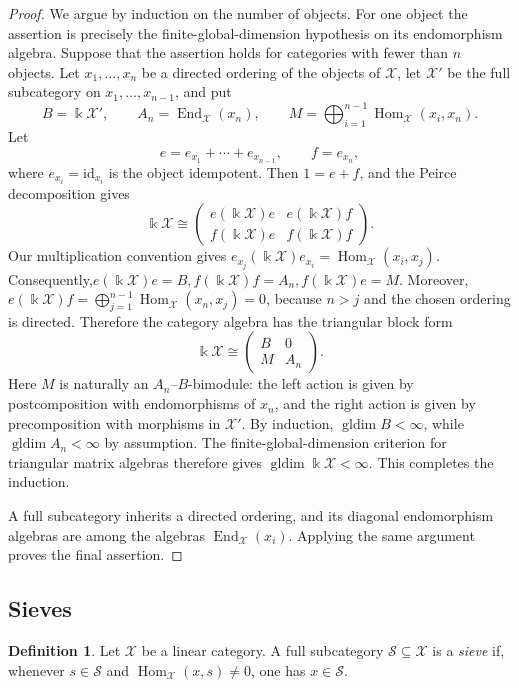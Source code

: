 \documentclass[12pt,a4paper,english,reqno]{amsart}
\theoremstyle{plain}
\theoremstyle{definition}
\newtheorem{definition}[theorem]{Definition}
\newcommand{\kk}{\Bbbk}
\newcommand{\Hom}{\operatorname{Hom}}
\newcommand{\End}{\operatorname{End}}
\newcommand{\gldim}{\operatorname{gldim}}
\newcommand{\id}{\mathrm{id}}
\newcommand{\X}{\mathcal X}
\begin{document}
\begin{proof}
We argue by induction on the number of objects.  For one object the assertion
is precisely the finite-global-dimension hypothesis on its endomorphism
algebra.  Suppose that the assertion holds for categories with fewer than
$n$ objects.  Let $x_1,\ldots,x_n$ be a directed ordering of the objects
of $\X$, let $\X'$ be the full subcategory on
$x_1,\ldots,x_{n-1}$, and put
\[
 B=\kk\X',\qquad A_n=\End_{\X}(x_n),\qquad
 M=\bigoplus_{i=1}^{n-1}\Hom_{\X}(x_i,x_n).
\]
Let
\[
e=e_{x_1}+\cdots+e_{x_{n-1}},
\qquad
f=e_{x_n},
\]
where $e_{x_i}=\id_{x_i}$ is the object idempotent. Then
$1=e+f$, and the Peirce decomposition gives
\[
\kk\X
\cong
\begin{pmatrix}
e(\kk\X)e & e(\kk\X)f\\
f(\kk\X)e & f(\kk\X)f
\end{pmatrix}.
\]
Our multiplication convention gives $e_{x_j}(\kk\X)e_{x_i}=\Hom_{\X}(x_i,x_j).
$
Consequently,$e(\kk\X)e=B, f(\kk\X)f=A_n, f(\kk\X)e=M$.
Moreover, $e(\kk\X)f=\bigoplus_{j=1}^{n-1}\Hom_{\X}(x_n,x_j)=0$,
because $n>j$ and the chosen ordering is directed. Therefore the
category algebra has the triangular block form
\[
\kk\X\cong
\begin{pmatrix}
B&0\\
M&A_n
\end{pmatrix}.
\]
Here $M$ is naturally an $A_n$--$B$-bimodule: the left action is
given by postcomposition with endomorphisms of $x_n$, and the right
action is given by precomposition with morphisms in $\X'$.
By induction,
$\gldim B<\infty$, while $\gldim A_n<\infty$ by assumption.  The
finite-global-dimension criterion for triangular matrix algebras
\cite[Corollary~6.3]{MinamotoYamaura} therefore gives
$\gldim\kk\X<\infty$.  This completes the induction.

A full subcategory inherits a directed ordering, and its diagonal
endomorphism algebras are among the algebras $\End_{\X}(x_i)$.  Applying
the same argument proves the final assertion.
\end{proof}

\subsection{Sieves}

\begin{definition}
Let $\X$ be a linear category.  A full subcategory $\mathcal S\subseteq\X$
is a \emph{sieve} if, whenever $s\in\mathcal S$ and
$\Hom_{\X}(x,s)\neq0$, one has $x\in\mathcal S$.
\end{definition}
\end{document}
